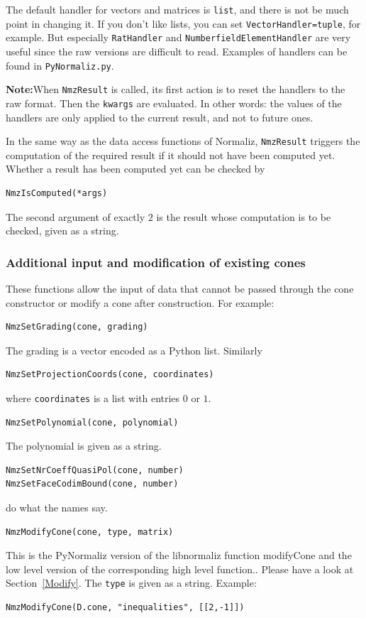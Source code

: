 \begin{small}
The default handler for vectors and matrices is \verb|list|, and there is not be much point in changing it. If you don't like lists, you can set \verb|VectorHandler=tuple|, for example. But especially \verb|RatHandler| and \verb|NumberfieldElementHandler| are very useful since the raw versions are difficult to read. Examples of handlers can be found in \verb|PyNormaliz.py|.

\textbf{Note:}\enspace When \verb|NmzResult| is called, its first action is to reset the handlers to the raw format. Then the \verb|kwargs| are evaluated. In other words: the values of the handlers are only applied to the current result, and not to future ones.

In the same way as the data access functions of Normaliz, \verb|NmzResult| triggers the computation of the required result if it should not have been computed yet. Whether a result has been computed yet can be checked by
\begin{Verbatim}
NmzIsComputed(*args)
\end{Verbatim}
The second argument of exactly $2$ is the result whose computation is to be checked, given as a string.

\subsubsection{Additional input and modification of existing cones}

These functions allow the input of data that cannot be passed through the cone constructor or modify a cone after construction. For example:
\begin{Verbatim}
NmzSetGrading(cone, grading)
\end{Verbatim}
The grading is a vector encoded as a Python list. Similarly
\begin{Verbatim}
NmzSetProjectionCoords(cone, coordinates)
\end{Verbatim}
where \verb|coordinates| is a list with entries $0$ or $1$.

\begin{Verbatim}
NmzSetPolynomial(cone, polynomial)
\end{Verbatim}
The polynomial is given as a string.

\begin{Verbatim}
NmzSetNrCoeffQuasiPol(cone, number)
NmzSetFaceCodimBound(cone, number)
\end{Verbatim}
do what the names say.

\begin{Verbatim}
NmzModifyCone(cone, type, matrix)
\end{Verbatim}
This is the PyNormaliz version of the libnormaliz function modifyCone and the low level version of the corresponding high level function.. Please have a look at Section~\ref{Modify}. The \verb*|type| is given as a string. Example:
\begin{Verbatim}
NmzModifyCone(D.cone, "inequalities", [[2,-1]])
\end{Verbatim}


\end{small}
